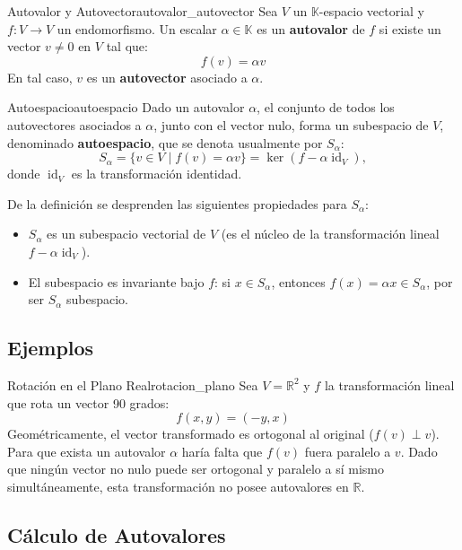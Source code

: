 \documentclass[11pt, a4paper]{article}
\begin{document}
\begin{definicion}{Autovalor y Autovector}{autovalor_autovector}
Sea $V$ un $\mathbb{K}$-espacio vectorial y $f: V \to V$ un endomorfismo.
Un escalar $\alpha \in \mathbb{K}$ es un \textbf{autovalor} de $f$ si existe un vector $v \neq 0$ en $V$ tal que:
\[ f(v) = \alpha v \]
En tal caso, $v$ es un \textbf{autovector} asociado a $\alpha$.
\end{definicion}

\begin{definicion}{Autoespacio}{autoespacio}
Dado un autovalor $\alpha$, el conjunto de todos los autovectores asociados a $\alpha$, junto con el vector nulo, forma un subespacio de $V$, denominado \textbf{autoespacio}, que se denota usualmente por $S_\alpha$:
\[ S_\alpha = \{ v \in V \mid f(v) = \alpha v \} = \ker(f - \alpha \operatorname{id}_V), \]
donde $\operatorname{id}_V$ es la transformación identidad.
\end{definicion}

\obs De la definición se desprenden las siguientes propiedades para $S_\alpha$:
\begin{itemize}
    \item $S_\alpha$ es un subespacio vectorial de $V$ (es el núcleo de la transformación lineal $f - \alpha \operatorname{id}_V$).
    \item El subespacio es invariante bajo $f$: si $x \in S_\alpha$, entonces $f(x) = \alpha x \in S_\alpha$, por ser $S_\alpha$ subespacio.
\end{itemize}

\subsection{Ejemplos}

\begin{ejemplo}{Rotación en el Plano Real}{rotacion_plano}
Sea $V = \mathbb{R}^2$ y $f$ la transformación lineal que rota un vector 90 grados:
\[ f(x, y) = (-y, x) \]
Geométricamente, el vector transformado es ortogonal al original ($f(v) \perp v$). Para que exista un autovalor $\alpha$ haría falta que $f(v)$ fuera paralelo a $v$. Dado que ningún vector no nulo puede ser ortogonal y paralelo a sí mismo simultáneamente, esta transformación no posee autovalores en $\mathbb{R}$.
\end{ejemplo}

\subsection{Cálculo de Autovalores}
\end{document}
